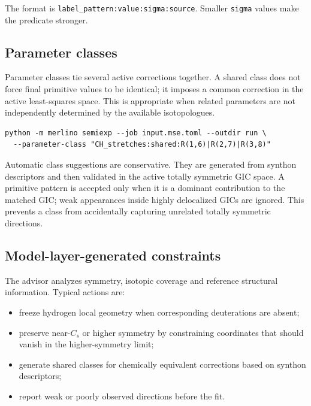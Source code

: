 \documentclass[11pt]{article}
\begin{document}
\noindent
The format is \texttt{label\_pattern:value:sigma:source}.  Smaller
\texttt{sigma} values make the predicate stronger.

\subsection{Parameter classes}

Parameter classes tie several active corrections together.  A shared class
does not force final primitive values to be identical; it imposes a common
correction in the active least-squares space.  This is appropriate when
related parameters are not independently determined by the available
isotopologues.

\begin{lstlisting}[style=merlino]
python -m merlino semiexp --job input.mse.toml --outdir run \
  --parameter-class "CH_stretches:shared:R(1,6)|R(2,7)|R(3,8)"
\end{lstlisting}

\noindent
Automatic class suggestions are conservative.  They are generated from
synthon descriptors and then validated in the active totally symmetric GIC
space.  A primitive pattern is accepted only when it is a dominant contribution
to the matched GIC; weak appearances inside highly delocalized GICs are
ignored.  This prevents a class from accidentally capturing unrelated
totally symmetric directions.

\subsection{Model-layer-generated constraints}

The advisor analyzes symmetry, isotopic coverage and reference structural
information.  Typical actions are:

\begin{itemize}
  \item freeze hydrogen local geometry when corresponding deuterations are
        absent;
  \item preserve near-\(C_s\) or higher symmetry by constraining coordinates
        that should vanish in the higher-symmetry limit;
  \item generate shared classes for chemically equivalent corrections based
        on synthon descriptors;
  \item report weak or poorly observed directions before the fit.
\end{itemize}
\end{document}
